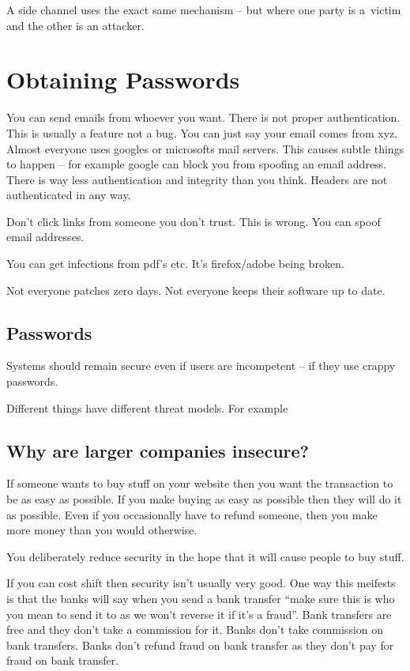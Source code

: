 \documentclass[10pt, a4paper]{article}
\begin{document}
A side channel uses the exact same mechanism -- but where one party is a\ victim and the other is an attacker.

\section{Obtaining Passwords}

You can send emails from whoever you want. There is not proper authentication. This
is usually a feature not a bug. You can just say your email comes from xyz. Almost everyone
uses googles or microsofts mail servers. This causes subtle things to happen -- for example
google can block you from spoofing an email address. There is way less authentication and
integrity than you think. Headers are not authenticated in any way.

Don't click links from someone you don't trust. This is wrong. You can spoof email addresses.

You can get infections from pdf's etc. It's firefox/adobe being broken.

Not everyone patches zero days. Not everyone keeps their software up to date.

\subsection{Passwords}

Systems should remain secure even if users are incompetent -- if they use crappy passwords.

Different things have different threat models. For example

\subsection{Why are larger companies insecure?}

If someone wants to buy stuff on your website then you want the transaction to be as
easy as possible. If you make buying as easy as possible then they will do it as possible.
Even if you occasionally have to refund someone, then you make more money than you would otherwise.

You deliberately reduce security in the hope that it will cause people to buy stuff.

If you can cost shift then security isn't usually very good.
One way this meifests is that the banks will say when you send a bank transfer ``make sure this is who you mean
to send it to as we won't reverse it if it's a fraud''. Bank transfers are free and they don't take a
commission for it. Banks don't take commission on bank transfers. Banks don't refund fraud on bank transfer as they
don't pay for fraud on bank transfer.
\end{document}
